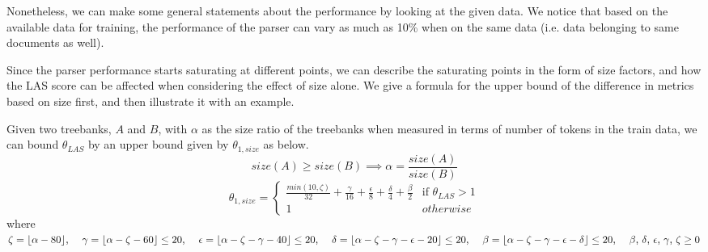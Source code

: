 Nonetheless, we can make some general statements about the performance by looking at the given data. We notice that based on the available data for training, the performance of the parser can vary as much as 10\% when on the same data (i.e. data belonging to same documents as well).

Since the parser performance starts saturating at different points, we can describe the saturating points in the form of size factors, and how the LAS score can be affected when considering the effect of size alone. We give a formula for the upper bound of the difference in metrics based on size first, and then illustrate it with an example.

\theoremstyle{definition}
\begin{definition}
\label{def:theta1_size}
    Given two treebanks, \(A\) and \(B\), with \(\alpha\) as the size ratio of the treebanks when measured in terms of number of tokens in the train data, we can bound \(\theta_{LAS}\) by an upper bound given by \(\theta_{1, size}\) as below.
    \begin{equation*}
        size(A) \geq size(B) \implies \alpha = \frac{size(A)}{size(B)}
    \end{equation*}
    \begin{equation}
    \theta_{1, size} = 
    \begin{cases}
         \frac{min(10, \zeta)}{32} + \frac{\gamma}{16} + \frac{\epsilon}{8} + \frac{\delta}{4} + \frac{\beta}{2} & \text{if } \theta_{LAS} > 1\\
        1 & otherwise
    \end{cases}
    \end{equation}
    where \(\zeta = \lfloor\alpha - 80\rfloor \text{, \quad} \gamma = \lfloor\alpha - \zeta - 60\rfloor \leq 20 \text{, \quad} \epsilon = \lfloor\alpha - \zeta - \gamma - 40\rfloor \leq 20 \text{, \quad} \delta = \lfloor\alpha - \zeta - \gamma - \epsilon - 20\rfloor \leq 20 \text{, \quad} \beta = \lfloor\alpha-\zeta-\gamma-\epsilon-\delta\rfloor \leq 20 \text{, \quad}\beta\text{, }\delta\text{, }\epsilon\text{, }\gamma\text{, }\zeta \geq 0\)
\end{definition}

